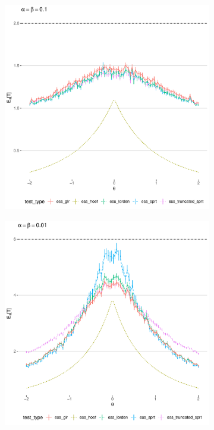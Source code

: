 \documentclass[10pt]{beamer}
\begin{document}
\begin{frame}
\begin{figure}
\centering
\begin{subfigure}{0.49\textwidth}
    \includegraphics[width=\textwidth]{images/ess_alpha1e1}
\end{subfigure}
\hfill
\begin{subfigure}{0.49\textwidth}
    \includegraphics[width=\textwidth]{images/ess_alpha1e2}
\end{subfigure}
\end{figure}

\end{frame}
\end{document}
